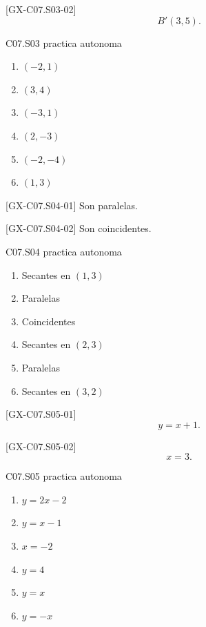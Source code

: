\begin{shortanswer}{[GX-C07.S03-02]}
\[
B'(3,5).
\]
\end{shortanswer}

\begin{shortanswer}{C07.S03 practica autonoma}
\begin{enumerate}[label=\textbf{PX-C07.S03-\arabic*:}, leftmargin=*]
  \item \((-2,1)\)
  \item \((3,4)\)
  \item \((-3,1)\)
  \item \((2,-3)\)
  \item \((-2,-4)\)
  \item \((1,3)\)
\end{enumerate}
\end{shortanswer}

\begin{shortanswer}{[GX-C07.S04-01]}
Son paralelas.
\end{shortanswer}

\begin{shortanswer}{[GX-C07.S04-02]}
Son coincidentes.
\end{shortanswer}

\begin{shortanswer}{C07.S04 practica autonoma}
\begin{enumerate}[label=\textbf{PX-C07.S04-\arabic*:}, leftmargin=*]
  \item Secantes en \((1,3)\)
  \item Paralelas
  \item Coincidentes
  \item Secantes en \((2,3)\)
  \item Paralelas
  \item Secantes en \((3,2)\)
\end{enumerate}
\end{shortanswer}

\begin{shortanswer}{[GX-C07.S05-01]}
\[
y=x+1.
\]
\end{shortanswer}

\begin{shortanswer}{[GX-C07.S05-02]}
\[
x=3.
\]
\end{shortanswer}

\begin{shortanswer}{C07.S05 practica autonoma}
\begin{enumerate}[label=\textbf{PX-C07.S05-\arabic*:}, leftmargin=*]
  \item \(y=2x-2\)
  \item \(y=x-1\)
  \item \(x=-2\)
  \item \(y=4\)
  \item \(y=x\)
  \item \(y=-x\)
\end{enumerate}
\end{shortanswer}

